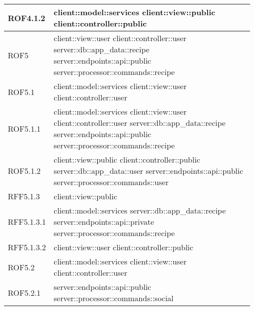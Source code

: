 \begin{center}
\begin{longtable}{| p{4cm} | p{8cm} |}
\hline
ROF4.1.2 & client::model::services \newline client::view::public \newline client::controller::public \\
\hline
ROF5 & client::view::user \newline client::controller::user \newline server::db::app\_data::recipe \newline server::endpoints::api::public \newline server::processor::commands::recipe \\
\hline
ROF5.1 & client::model::services \newline client::view::user \newline client::controller::user \\
\hline
ROF5.1.1 & client::model::services \newline client::view::user \newline client::controller::user \newline server::db::app\_data::recipe \newline server::endpoints::api::public \newline server::processor::commands::recipe \\
\hline
ROF5.1.2 & client::view::public \newline client::controller::public \newline server::db::app\_data::user \newline server::endpoints::api::public \newline server::processor::commands::user \\
\hline
RFF5.1.3 & client::view::public \\
\hline
RFF5.1.3.1 & client::model::services \newline server::db::app\_data::recipe \newline server::endpoints::api::private \newline server::processor::commands::recipe \\
\hline
RFF5.1.3.2 & client::view::user \newline client::controller::public \\
\hline
ROF5.2 & client::model::services \newline client::view::user \newline client::controller::user \\
\hline
ROF5.2.1 & server::endpoints::api::public \newline server::processor::commands::social \\

\end{longtable}
\end{center}
